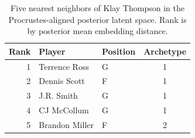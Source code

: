 \begin{table}[htbp]
  \centering\small
  \begin{tabular}{rllc}
    \toprule
    Rank & Player & Position & Archetype \\
    \midrule
    1 & Terrence Ross & G & 1 \\
    2 & Dennis Scott & F & 1 \\
    3 & J.R. Smith & G & 1 \\
    4 & CJ McCollum & G & 1 \\
    5 & Brandon Miller & F & 2 \\
    \bottomrule
  \end{tabular}
  \caption{Five nearest neighbors of Klay Thompson in the Procrustes-aligned posterior latent space. Rank is by posterior mean embedding distance.}
  \label{tab:Klay_Thompson_neighbors}
\end{table}

